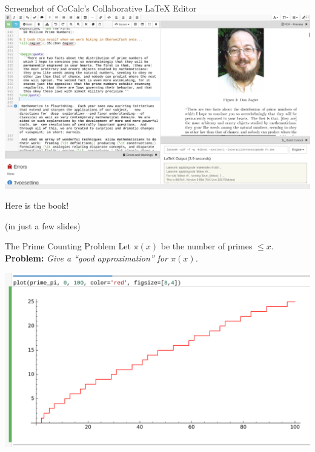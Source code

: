 \documentclass{beamer}
\begin{document}
\begin{frame}{Screenshot of CoCalc's Collaborative \LaTeX{} Editor}
  \includegraphics[width=\textwidth]{pics/cocalc-latex}
\end{frame}

\begin{frame}{}
  \vfill
  \begin{center}
    \hrulefill
    \vfill
    \Huge\sc Here is the book!
    \vfill
    \hrulefill
  \end{center}
  \vfill
  \begin{center}
    (in just a few slides)
  \end{center}
\end{frame}


\begin{frame}{The Prime Counting Problem}
  Let $\pi(x)$ be the number of primes $\leq x$.\\
  {\bf Problem:} {\em Give a ``good approximation'' for $\pi(x)$.}
  \vfill

  \includegraphics[width=.98\textwidth]{pics/prime-pi-100}

\end{frame}
\end{document}
